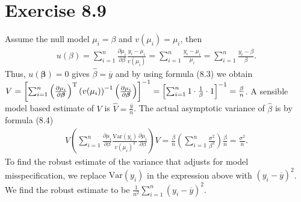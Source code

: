 \documentclass[a4paper]{article}
\newcommand{\Var}{\mathrm{Var}}
\begin{document}
\vspace{\baselineskip}
\section{Exercise 8.9}
Assume the null model $\mu_{i} = \beta$ and $v(\mu_{i}) = \mu_{i}$, then
\begin{align*}
u(\beta) = \sum_{i=1}^{n}\frac{\partial \mu_{i}}{\partial \beta} \frac{y_{i}-\mu_{i}}{v(\mu_{i})} = \sum_{i=1}^{n}\frac{y_{i}-\mu_{i}}{\mu_{i}} = \sum_{i=1}^{n}\frac{y_{i}-\beta}{\beta}.
\end{align*}
Thus, $u(\bm{\beta}) = 0$ gives $\widehat{\beta} = \overline{y}$ and by using formula (8.3) we obtain $V = \left[\sum_{i=1}^{n}\left(\frac{\partial \mu_{i}}{\partial \bm{\beta}}\right)^{\rm T}\left(v(\mu_{i})\right)^{-1}\left(\frac{\partial \mu_{i}}{\partial \bm{\beta}}\right)\right]^{-1} = \left[\sum_{i=1}^{n}1 \cdot \frac{1}{\beta} \cdot 1\right]^{-1} = \frac{\beta}{n}$. A sensible model based estimate of $V$ is $\widehat{V} = \frac{\overline{y}}{n}$. The actual asymptotic variance of $\widehat{\beta}$ is by formula (8.4)
\begin{align*}
V\left(\sum_{i=1}^{n}\frac{\partial \mu_{i}}{\partial \beta}\frac{\Var(y_{i})}{v(\mu_{i})^{2}}\frac{\partial \mu_{i}}{\partial \beta}\right)V = \frac{\beta}{n}\left(\sum_{i=1}^{n}\frac{\sigma^{2}}{\beta^{2}}\right)\frac{\beta}{n} = \frac{\sigma^{2}}{n}.
\end{align*}
To find the robust estimate of the variance that adjusts for model misspecification, we replace $\Var(y_{i})$ in the expression above with $(y_{i}-\overline{y})^{2}$. We find the robust estimate to be $\frac{1}{n^{2}}\sum_{i=1}^{n}(y_{i}-\overline{y})^{2}$.



\vspace{\baselineskip}
\end{document}
